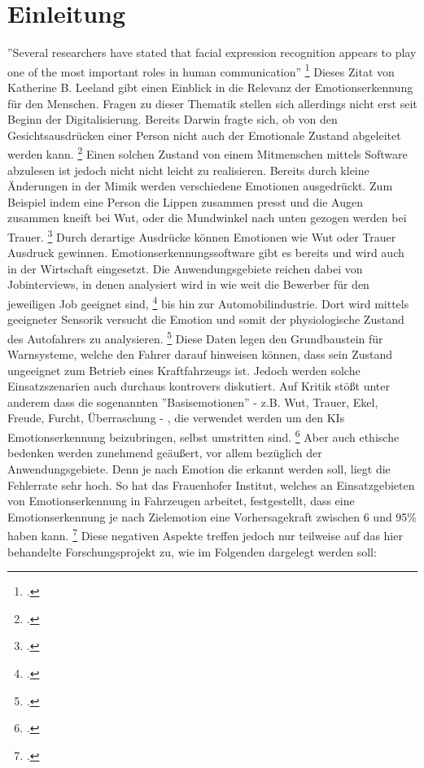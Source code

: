\documentclass[12pt, a4paper]{scrbook}
\begin{document}
\chapter{Einleitung}
''Several researchers have stated that facial expression recognition appears to play one of the most important roles in human communication'' 
\footcite[Vgl.][1]{FaceRec}
Dieses Zitat von Katherine B. Leeland gibt einen Einblick in die Relevanz der Emotionserkennung für den Menschen. Fragen zu dieser Thematik stellen sich allerdings nicht erst seit Beginn der Digitalisierung. Bereits Darwin
fragte sich, ob von den Gesichtsausdrücken einer Person nicht auch der Emotionale Zustand abgeleitet werden kann.
\footcite[Vgl.][2]{FaceRec}
Einen solchen Zustand von einem Mitmenschen mittels Software abzulesen ist jedoch nicht nicht leicht zu realisieren. Bereits durch kleine Änderungen in der Mimik werden verschiedene Emotionen ausgedrückt. Zum Beispiel indem eine Person die Lippen zusammen presst und die Augen zusammen kneift bei Wut, oder die Mundwinkel nach unten gezogen werden bei Trauer.
\footcite[Vgl.][249]{HandbookFaceRec}
Durch derartige Ausdrücke können Emotionen wie Wut oder Trauer Ausdruck gewinnen.
Emotionserkennungssoftware gibt es bereits und wird auch in der Wirtschaft eingesetzt. Die Anwendungsgebiete reichen dabei von Jobinterviews, in denen analysiert wird in wie weit die Bewerber für
den jeweiligen Job geeignet sind, 
\footcite[Vgl.][]{mixedArticle}
bis hin zur Automobilindustrie. Dort wird mittels geeigneter Sensorik versucht die Emotion und somit der physiologische Zustand des Autofahrers zu analysieren.
\footcite[Vgl.][Herausforderung]{Frauenhofer}
Diese Daten legen den Grundbaustein für Warnsysteme, welche den Fahrer darauf hinweisen können, dass sein Zustand ungeeignet zum Betrieb eines Kraftfahrzeugs ist. Jedoch werden
solche Einsatzszenarien auch durchaus kontrovers diskutiert. Auf Kritik stößt unter anderem dass die sogenannten ''Basisemotionen'' - z.B. Wut, Trauer, Ekel, Freude, Furcht, Überraschung - , die verwendet werden um den KIs Emotionserkennung
beizubringen, selbst umstritten sind.
\footcite[Vgl.][]{SZ}
Aber auch ethische bedenken werden zunehmend geäußert, vor allem bezüglich der Anwendungsgebiete. Denn je nach Emotion die erkannt werden soll, liegt die Fehlerrate sehr hoch. So hat das
Frauenhofer Institut, welches an Einsatzgebieten von Emotionserkennung in Fahrzeugen arbeitet, festgestellt, dass eine Emotionserkennung je nach Zielemotion eine Vorhersagekraft zwischen 6 und
95\% haben kann.
\footcite[Vgl.][Ergebnis]{Frauenhofer}
Diese negativen Aspekte treffen jedoch nur teilweise auf das hier behandelte Forschungsprojekt zu, wie im Folgenden dargelegt werden soll:
\end{document}
